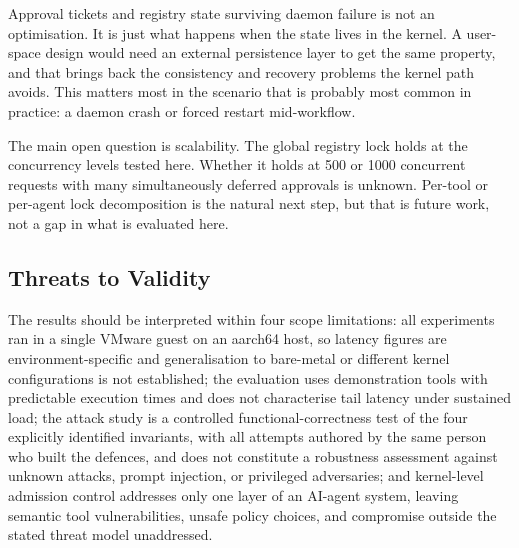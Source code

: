 Approval tickets and registry state surviving daemon failure is not an optimisation.
It is just what happens when the state lives in the kernel.
A user-space design would need an external persistence layer to get the same property, and that brings back the consistency and recovery problems the kernel path avoids.
This matters most in the scenario that is probably most common in practice: a daemon crash or forced restart mid-workflow.

The main open question is scalability.
The global registry lock holds at the concurrency levels tested here.
Whether it holds at 500 or 1000 concurrent requests with many simultaneously deferred approvals is unknown.
Per-tool or per-agent lock decomposition is the natural next step, but that is future work, not a gap in what is evaluated here.



\subsection{Threats to Validity}

The results should be interpreted within four scope limitations: all experiments ran in a single VMware guest on an aarch64 host, so latency figures are environment-specific and generalisation to bare-metal or different kernel configurations is not established; the evaluation uses demonstration tools with predictable execution times and does not characterise tail latency under sustained load; the attack study is a controlled functional-correctness test of the four explicitly identified invariants, with all attempts authored by the same person who built the defences, and does not constitute a robustness assessment against unknown attacks, prompt injection, or privileged adversaries; and kernel-level admission control addresses only one layer of an AI-agent system, leaving semantic tool vulnerabilities, unsafe policy choices, and compromise outside the stated threat model unaddressed.